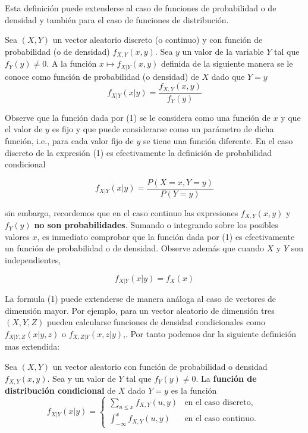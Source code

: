 \documentclass[a4paper,12pt]{article}
\begin{document}
Esta definición puede extenderse al caso de funciones de probabilidad o de densidad y también para el caso de funciones de distribución. \\

    \begin{definition} [Función de Densidad de $X | Y = y$]
        Sea $(X,Y)$ un vector aleatorio discreto (o continuo) y con función de probabilidad (o de densidad) $f_{X,Y}(x,y)$. Sea $y$ un valor de la variable $Y$ tal que $f_{Y}(y) \neq 0$. A la función $x \mapsto f_{X|Y}(x,y) $ definida de la siguiente manera se le conoce como función de probabilidad (o densidad) de $X$ dado que $Y = y$
        \begin{equation}
             f_{X|Y}(x|y) = \dfrac{f_{X,Y}(x,y)}{f_{Y}(y)}
        \end{equation}
    \end{definition}

Observe que la función dada por (1) se le considera como una función de $x$ y que el valor de $y$ es fijo y que puede considerarse como un parámetro de dicha función, i.e., para cada valor fijo de $y$ se tiene una función diferente. En el caso discreto de la expresión (1) es efectivamente la definición de probabilidad condicional

    \begin{equation*}
             f_{X|Y}(x|y) = \dfrac{P(X = x, Y= y)}{P(Y=y)}
    \end{equation*}

sin embargo, recordemos que en el caso continuo las expresiones $f_{X,Y}(x,y)$ y $f_{Y}(y)$ \textbf{no son probabilidades}. Sumando o integrando sobre los posibles valores $x$, es inmediato comprobar que la función dada por (1) es efectivamente un función de probabilidad o de densidad. Observe además que cuando $X$ y $Y$ son independientes,

    \begin{equation*}
         f_{X|Y}(x|y) =  f_{X}(x)
    \end{equation*}

La formula (1) puede extenderse de manera análoga al caso de vectores de dimensión mayor. Por ejemplo, para un vector aleatorio de dimensión tres $(X,Y,Z)$ pueden calcularse funciones de densidad condicionales como $f_{X|Y,Z}(x | y,z)$ o $f_{X, Z|Y}(x, z | y)$,. Por tanto podemos dar la siguiente definición mas extendida:

    \begin{definition}
        Sea $(X,Y)$ un vector aleatorio con función de probabilidad o densidad $f_{X,Y}(x,y)$. Sea y un valor de $Y$ tal que $f_{Y}(y) \neq 0$. La \textbf{función de distribución condicional} de $X$ dado $Y = y$ es la función
        \begin{equation}
            f_{X|Y}(x|y) = \begin{cases} \sum_{u \leq x} f_{X,Y}(u,y) & \text{en el caso discreto, } \\ \int_{-\infty}^{x} f_{X,Y}(u,y) & \text{en el caso continuo. }  \end{cases}
        \end{equation}
    \end{definition}
\end{document}
